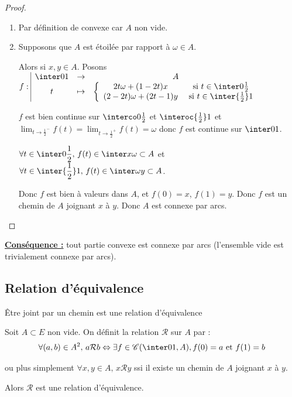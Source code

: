 \begin{proof}~
    \begin{enumerate}
        \item Par définition de convexe car $A$ non vide. 

        \item Supposons que $A$ est étoilée par rapport à $\omega \in A$.

        Alors si $x, y \in A$. Posons $f: \space \begin{array}{|ccc}
        \inter 0 1 & \to & A \\
        t & \mapsto & \left\{ \begin{array}{cc}
            2t \omega + (1 - 2t)x & \text{ si } t \in \inter 0 {\frac 1 2} \\
            (2 - 2t) \omega + (2t - 1)y & \text{ si } t \in \inter {\frac 1 2} 1        
        \end{array} \right.
        \end{array}$

        $f$ est bien continue sur $\interco 0 {\frac 1 2}$ et $\interoc {\frac 1 2} 1$ et 
        $\displaystyle \lim_{t \to \frac 1 2^-} f(t) = \lim_{t \to \frac 1 2^+} f(t) = \omega$ donc $f$ est continue sur $\inter 0 1$.

        $\displaystyle \forall t \in \inter 0 {\frac 1 2}, \, f(t) \in \inter x \omega \subset A$ et
        $\displaystyle \forall t \in \inter {\frac 1 2} 1, \, f(t) \in \inter \omega y \subset A$.

        Donc $f$ est bien à valeurs dans $A$, et $f(0) = x$, $f(1) = y$. 
        Donc $f$ est un chemin de $A$ joignant $x$ à $y$. Donc $A$ est connexe par arcs.
    \end{enumerate}
\end{proof}

\textbf{\uline{Conséquence :}} tout partie convexe est connexe par arcs (l'ensemble vide est trivialement connexe par arcs).

\subsection{Relation d'équivalence}

\begin{theoreme}{Être joint par un chemin est une relation d'équivalence}{}

    Soit $A \subset E$ non vide.
    On définit la relation $\mathcal R$ sur $A$ par : 
    $$\forall (a, b) \in A^2, \, a \mathcal R b \Leftrightarrow \exists f \in \mathscr C(\inter 0 1, A), f(0) = a \text{ et } f(1) = b$$

    ou plus simplement $\forall x, y \in A, \, x \mathcal R y$ ssi il existe un chemin de $A$ joignant $x$ à $y$.
    
    Alors $\mathcal R$ est une relation d'équivalence.
\end{theoreme}

